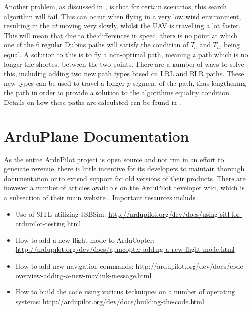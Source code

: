 Another problem, as discussed in \cite{mcgee2005optimal}, is that for certain scenarios, this search algorithm will fail. This can occur when flying in a very low wind environment, resulting in the $vt$ moving very slowly, whilst the UAV is travelling a lot faster. This will mean that due to the differences in speed, there is no point at which one of the 6 regular Dubins paths will satisfy the condition of $T_a$ and $T_{vt}$ being equal. A solution to this is to fly a non-optimal path, meaning a path which is no longer the shortest between the two points. There are a number of ways to solve this, including adding two new path types based on LRL and RLR paths. These new types can be used to travel a longer $p$ segment of the path, thus lengthening the path in order to provide a solution to the algorithms equality condition. Details on how these paths are calculated can be found in \cite{mcgee2005optimal}. 


\section{ArduPlane Documentation}
\label{litrev:arduplane}

As the entire ArduPilot project is open source and not run in an effort to generate revenue, there is little incentive for its developers to maintain thorough documentation or to extend support for old versions of their products. There are however a number of articles available on the ArduPilot developer wiki, which is a subsection of their main website \cite{ArduPilotDev}. Important resources include
\begin{itemize}
  	\item Use of SITL utilizing JSBSim: \url{http://ardupilot.org/dev/docs/using-sitl-for-ardupilot-testing.html}
  	\item How to add a new flight mode to ArduCopter: \url{http://ardupilot.org/dev/docs/apmcopter-adding-a-new-flight-mode.html}
  	\item How to add new navigation commands: \url{http://ardupilot.org/dev/docs/code-overview-adding-a-new-mavlink-message.html}
  	\item How to build the code using various techniques on a number of operating systems: \url{http://ardupilot.org/dev/docs/building-the-code.html}
  \end{itemize}  


